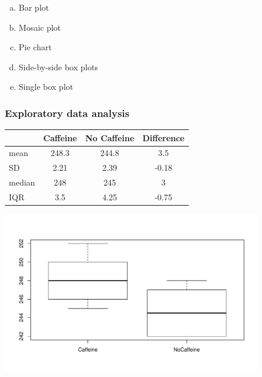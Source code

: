 \documentclass[11pt,containsverbatim,handout,xcolor=xelatex,dvipsnames,table]{beamer}
\newcommand{\solnMult}[1]{#1}
\begin{document}

\begin{frame}
\frametitle{}


\begin{enumerate}[(a)]
\item Bar plot
\item Mosaic plot
\item Pie chart
\item \solnMult{Side-by-side box plots}
\item Single box plot
\end{enumerate}

\end{frame}


\begin{frame}
\frametitle{Exploratory data analysis}

{
\begin{center}
{\small
\begin{tabular}{l | c | c | c}
\hline
		& Caffeine	& No Caffeine	& Difference \\
\hline
mean	&  248.3		& 244.8 		& 3.5 \\
SD		& 2.21		& 2.39 		& -0.18 \\
median	& 248		& 245 		& 3 \\
IQR		& 3.5			& 4.25		& -0.75 \\
\hline
\end{tabular}
}
\end{center}
}

\vspace{-1cm}

\begin{center}
\includegraphics[width=0.85\textwidth]{figures/caffeine/caffeinetaps_box.pdf}
\end{center}

\end{frame}
\end{document}
